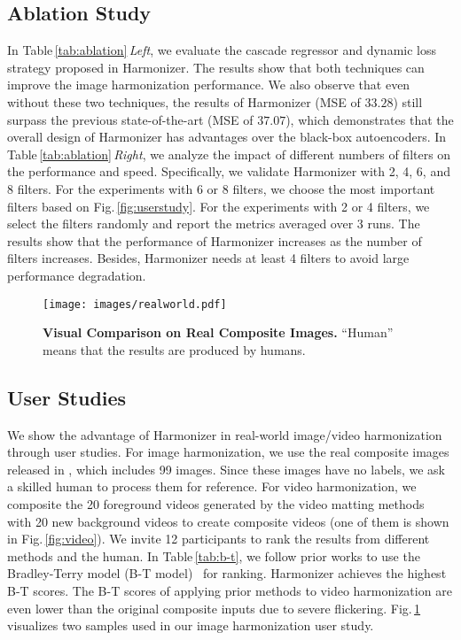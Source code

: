 \documentclass[runningheads]{llncs}
\newcommand{\ke}[1]{{\color{black}#1}}
\begin{document}
\subsection{Ablation Study}\label{sec:4_3}
In Table\,\ref{tab:ablation}\,\textit{Left}, we evaluate the cascade regressor and dynamic loss strategy proposed in Harmonizer. The results show that both techniques can improve the image harmonization performance. We also observe that even without these two techniques, the results of Harmonizer (MSE of $33.28$) still surpass the previous state-of-the-art (MSE of $37.07$), which demonstrates that the overall design of Harmonizer has advantages over the black-box autoencoders. 
In Table\,\ref{tab:ablation}\,\textit{Right}, we analyze the impact of different numbers of filters on the performance and speed. 
Specifically, we validate Harmonizer with 2, 4, 6, and 8 filters. 
For the experiments with 6 or 8 filters, we choose the most important filters based on Fig.\,\ref{fig:userstudy}. For the experiments with 2 or 4 filters, we select the filters randomly and report the metrics averaged over 3 runs. The results show that the performance of Harmonizer increases as the number of filters increases. Besides, Harmonizer needs at least 4 filters to avoid large performance degradation.




 \begin{figure}[t]
\centering
\texttt{[image: images/realworld.pdf]}
{\begin{center}
\vspace{-0.5cm}
\caption{\textbf{Visual Comparison on Real Composite Images.} ``Human'' means that the results are produced by humans.}
\label{fig:realworld}
\end{center}
}
\vspace{-0.4cm}
\end{figure}




\subsection{User Studies}\label{sec:4_4}


We show the advantage of Harmonizer in real-world image/video harmonization through user studies. For image harmonization, we use the real composite images released in \cite{DIH}, which includes 99 images. Since these images have no labels, we ask a skilled human to process them for reference. For video harmonization, we composite the 20 foreground videos generated by the video matting methods~\cite{Qin_2020_PR,MODNet,lin2021robust} with 20 new background videos to create \ke{composite} videos (one of them is shown in Fig.\,\ref{fig:video}). 
We invite 12 participants to rank the results from different methods and the human. In Table\,\ref{tab:b-t}, we follow prior works to use the Bradley-Terry model (B-T model)~\cite{btmodel} for ranking.
Harmonizer achieves the highest B-T scores. The B-T scores of applying prior methods to video harmonization are even lower than the original composite inputs due to severe flickering.
Fig.\,\ref{fig:realworld} visualizes two samples used in our image harmonization user study.
\end{document}
